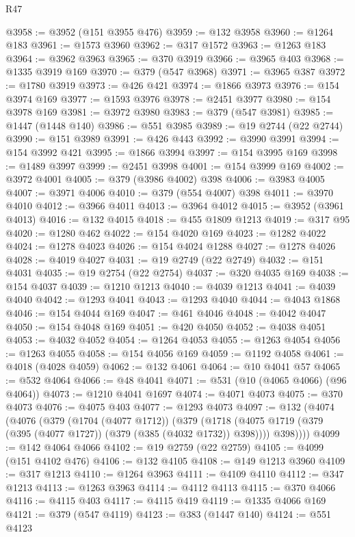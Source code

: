 \begin{lexlean}{R47}
\begin{coremodule}
@3958 := @3952 (@151 @3955 @476)
@3959 := @132 @3958
@3960 := @1264 @183
@3961 := @1573 @3960
@3962 := @317 @1572
@3963 := @1263 @183
@3964 := @3962 @3963
@3965 := @370 @3919
@3966 := @3965 @403
@3968 := @1335 @3919 @169
@3970 := @379 (@547 @3968)
@3971 := @3965 @387
@3972 := @1780 @3919
@3973 := @426 @421
@3974 := @1866 @3973
@3976 := @154 @3974 @169
@3977 := @1593 @3976
@3978 := @2451 @3977
@3980 := @154 @3978 @169
@3981 := @3972 @3980
@3983 := @379 (@547 @3981)
@3985 := @1447 (@1448 @140)
@3986 := @551 @3985
@3989 := @19 @2744 (@22 @2744)
@3990 := @151 @3989
@3991 := @426 @443
@3992 := @3990 @3991
@3994 := @154 @3992 @421
@3995 := @1866 @3994
@3997 := @154 @3995 @169
@3998 := @1489 @3997
@3999 := @2451 @3998
@4001 := @154 @3999 @169
@4002 := @3972 @4001
@4005 := @379 (@3986 @4002) @398
@4006 := @3983 @4005
@4007 := @3971 @4006
@4010 := @379 (@554 @4007) @398
@4011 := @3970 @4010
@4012 := @3966 @4011
@4013 := @3964 @4012
@4015 := @3952 (@3961 @4013)
@4016 := @132 @4015
@4018 := @455 @1809 @1213
@4019 := @317 @95
@4020 := @1280 @462
@4022 := @154 @4020 @169
@4023 := @1282 @4022
@4024 := @1278 @4023
@4026 := @154 @4024 @1288
@4027 := @1278 @4026
@4028 := @4019 @4027
@4031 := @19 @2749 (@22 @2749)
@4032 := @151 @4031
@4035 := @19 @2754 (@22 @2754)
@4037 := @320 @4035 @169
@4038 := @154 @4037
@4039 := @1210 @1213
@4040 := @4039 @1213
@4041 := @4039 @4040
@4042 := @1293 @4041
@4043 := @1293 @4040
@4044 := @4043 @1868
@4046 := @154 @4044 @169
@4047 := @461 @4046
@4048 := @4042 @4047
@4050 := @154 @4048 @169
@4051 := @420 @4050
@4052 := @4038 @4051
@4053 := @4032 @4052
@4054 := @1264 @4053
@4055 := @1263 @4054
@4056 := @1263 @4055
@4058 := @154 @4056 @169
@4059 := @1192 @4058
@4061 := @4018 (@4028 @4059)
@4062 := @132 @4061
@4064 := @10 @4041 @57
@4065 := @532 @4064
@4066 := @48 @4041
@4071 := @531 (@10 (@4065 @4066) (@96 @4064))
@4073 := @1210 @4041 @1697
@4074 := @4071 @4073
@4075 := @370 @4073
@4076 := @4075 @403
@4077 := @1293 @4073
@4097 := @132
    (@4074
      (@4076
        (@379
          (@1704 (@4077 @1712))
          (@379
            (@1718 (@4075 @1719 (@379 (@395 (@4077 @1727)) (@379 (@385 (@4032 @1732)) @398))))
            @398))))
@4099 := @142 @4064 @4066
@4102 := @19 @2759 (@22 @2759)
@4105 := @4099 (@151 @4102 @476)
@4106 := @132 @4105
@4108 := @149 @1213 @3960
@4109 := @317 @1213
@4110 := @1264 @3963
@4111 := @4109 @4110
@4112 := @347 @1213
@4113 := @1263 @3963
@4114 := @4112 @4113
@4115 := @370 @4066
@4116 := @4115 @403
@4117 := @4115 @419
@4119 := @1335 @4066 @169
@4121 := @379 (@547 @4119)
@4123 := @383 (@1447 @140)
@4124 := @551 @4123

\end{coremodule}
\end{lexlean}
